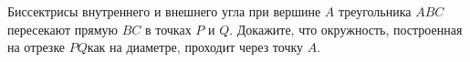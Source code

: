 \begin{ex}
	\begin{condition}
		Биссектрисы внутреннего и внешнего угла при вершине \( A  \) треугольника \( ABC  \) пересекают прямую \( BC  \) в точках \( P  \) и \( Q \). Докажите, что окружность, построенная на отрезке \( PQ \)как на диаметре, проходит через точку \( A \).
	\end{condition}
\end{ex}